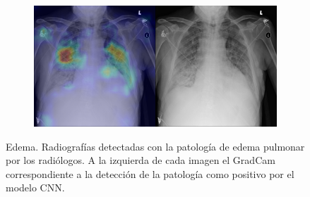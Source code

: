 \begin{figure}[b]
\begin{subfigure}{0.4\textwidth}
    \end{subfigure}
    \begin{subfigure}{0.4\textwidth}
        \centering
        \includegraphics[width=1.0\textwidth]{Chapters/5. Conclusiones/img/Edema/1_1_00011583_006.png}
    \end{subfigure}

    \caption[short]{Edema. Radiografías detectadas con la patología de edema pulmonar por los
                    radiólogos. A la izquierda de cada imagen el GradCam correspondiente a la detección
                    de la patología como positivo por el modelo CNN.}
\end{figure}

